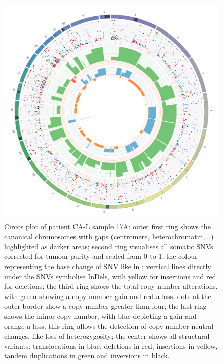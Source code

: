 \begin{figure}[ht]
\centering
\includegraphics[width=.99\linewidth]{Figures/CASCADE/CA86/CA86-17A.circos.png}
\caption[Circos plot of patient CA-L sample 17A]{Circos plot of patient CA-L sample 17A: outer first ring shows the canonical chromosomes with gaps (centromere, heterochromatin,...) highlighted as darker areas; second ring visualises all somatic SNVs corrected for tumour purity and scaled from 0 to 1, the colour representing the base change of SNV like in \protect\textcite{Alexandrov2013}; vertical lines directly under the SNVs symbolise InDels, with yellow for insertions and red for deletions; the third ring shows the total copy number alterations, with green showing a copy number gain and red a loss, dots at the outer border show a copy number greater than four; the last ring shows the minor copy number, with blue depicting a gain and orange a loss, this ring allows the detection of copy number neutral changes, like loss of heterozygosity; the center shows all structural variants: translocations in blue, deletions in red, insertions in yellow, tandem duplications in green and inversions in black.} \label{fig:ca86.17Acircos}
\end{figure}



